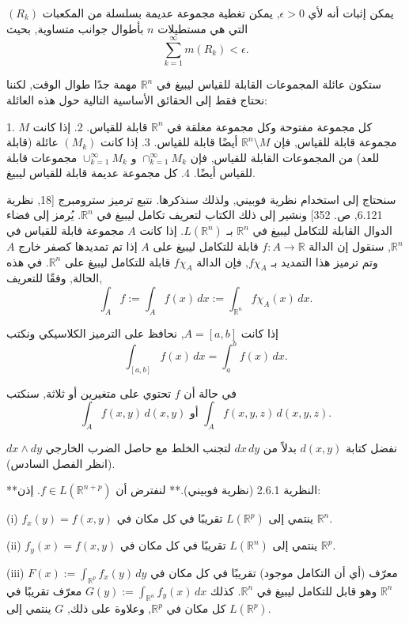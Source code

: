 يمكن إثبات أنه لأي \(\epsilon > 0\), يمكن تغطية مجموعة عديمة بسلسلة من المكعبات \( (R_k) \) التي هي مستطيلات \( n \) بأطوال جوانب متساوية, بحيث
\[ \sum_{k=1}^{\infty} m(R_k) < \epsilon. \]

ستكون عائلة المجموعات القابلة للقياس ليبيغ في \( \mathbb{R}^n \) مهمة جدًا طوال الوقت, لكننا نحتاج فقط إلى الحقائق الأساسية التالية حول هذه العائلة:

1. كل مجموعة مفتوحة وكل مجموعة مغلقة في \( \mathbb{R}^n \) قابلة للقياس.
2. إذا كانت \( M \) مجموعة قابلة للقياس, فإن \( \mathbb{R}^n \setminus M \) أيضًا قابلة للقياس.
3. إذا كانت \( (M_k) \) عائلة (قابلة للعد) من المجموعات القابلة للقياس, فإن \( \cap_{k=1}^{\infty} M_k \) و \( \cup_{k=1}^{\infty} M_k \) مجموعات قابلة للقياس أيضًا.
4. كل مجموعة عديمة قابلة للقياس ليبيغ.

سنحتاج إلى استخدام نظرية فوبيني, ولذلك سنذكرها. نتبع ترميز سترومبرج [18, نظرية 6.121, ص. 352] ونشير إلى ذلك الكتاب لتعريف تكامل ليبيغ في \( \mathbb{R}^n \). يُرمز إلى فضاء الدوال القابلة للتكامل ليبيغ في \( \mathbb{R}^n \) بـ \( L(\mathbb{R}^n) \). إذا كانت \( A \) مجموعة قابلة للقياس في \( \mathbb{R}^n \), سنقول إن الدالة \( f : A \to \mathbb{R} \) قابلة للتكامل ليبيغ على \( A \) إذا تم تمديدها كصفر خارج \( A \) وتم ترميز هذا التمديد بـ \( f \chi_A \), فإن الدالة \( f \chi_A \) قابلة للتكامل ليبيغ على \( \mathbb{R}^n \). في هذه الحالة, وفقًا للتعريف,
\[ \int_A f := \int_A f(x) \, dx := \int_{\mathbb{R}^n} f \chi_A(x) \, dx. \]

إذا كانت \( A = [a, b] \), نحافظ على الترميز الكلاسيكي ونكتب
\[ \int_{[a,b]} f(x) \, dx = \int_a^b f(x) \, dx. \]

في حالة أن \( f \) تحتوي على متغيرين أو ثلاثة, سنكتب
\[ \int_A f(x, y) \, d(x, y) \text{ أو } \int_A f(x, y, z) \, d(x, y, z). \]

نفضل كتابة \( d(x, y) \) بدلاً من \( dx \, dy \) لتجنب الخلط مع حاصل الضرب الخارجي \( dx \wedge dy \) (انظر الفصل السادس).



**النظرية 2.6.1 (نظرية فوبيني).**
لنفترض أن \( f \in L(\mathbb{R}^{n+p}) \). إذن:

(i) \( f_x(y) = f(x, y) \) ينتمي إلى \( L(\mathbb{R}^p) \) تقريبًا في كل مكان في \( \mathbb{R}^n \).

(ii) \( f_y(x) = f(x, y) \) ينتمي إلى \( L(\mathbb{R}^n) \) تقريبًا في كل مكان في \( \mathbb{R}^p \).

(iii) \( F(x) := \int_{\mathbb{R}^p} f_x(y) \, dy \) معرّف (أي أن التكامل موجود) تقريبًا في كل مكان في \( \mathbb{R}^n \) وهو قابل للتكامل ليبيغ في \( \mathbb{R}^n \). كذلك \( G(y) := \int_{\mathbb{R}^n} f_y(x) \, dx \) معرّف تقريبًا في كل مكان في \( \mathbb{R}^p \), وعلاوة على ذلك, \( G \) ينتمي إلى \( L(\mathbb{R}^p) \).

